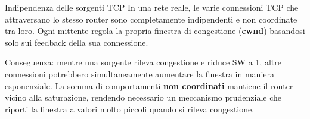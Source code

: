 \documentclass[a4paper,12pt]{report}
\begin{document}
\begin{notebox}{Indipendenza delle sorgenti TCP}
In una rete reale, le varie connessioni TCP che attraversano lo stesso router 
sono completamente indipendenti e non coordinate tra loro.  
Ogni mittente regola la propria finestra di congestione (\textbf{cwnd}) basandosi 
solo sui feedback della sua connessione.

Conseguenza: mentre una sorgente rileva congestione e riduce SW a 1, altre connessioni potrebbero simultaneamente aumentare la finestra in maniera esponenziale.  
La somma di comportamenti \textbf{non coordinati} mantiene il router vicino alla saturazione, rendendo necessario un meccanismo prudenziale che riporti la finestra a valori molto piccoli quando si rileva congestione.
\end{notebox}
\end{document}

